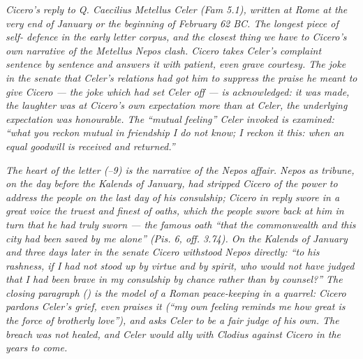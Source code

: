 
\textit{Cicero's reply to Q. Caecilius Metellus Celer (Fam
5.1), written at Rome at the very end of January or the
beginning of February 62 BC. The longest piece of self-
defence in the early letter corpus, and the closest thing
we have to Cicero's own narrative of the Metellus Nepos
clash. Cicero takes Celer's complaint sentence by sentence
and answers it with patient, even grave courtesy. The
joke in the senate that Celer's relations had got him to
suppress the praise he meant to give Cicero --- the joke
which had set Celer off --- is acknowledged: it was made,
the laughter was at Cicero's own expectation more than at
Celer, the underlying expectation was honourable. The
``mutual feeling'' Celer invoked is examined: ``what you
reckon mutual in friendship I do not know; I reckon it
this: when an equal goodwill is received and returned.''}

\textit{The heart of the letter (--9) is
the narrative of the Nepos affair. Nepos as tribune, on
the day before the Kalends of January, had stripped
Cicero of the power to address the people on the last
day of his consulship; Cicero in reply swore in a great
voice the truest and finest of oaths, which the people
swore back at him in turn that he had truly sworn ---
the famous oath ``that the commonwealth and this city
had been saved by me alone'' (Pis. 6, off. 3.74). On the
Kalends of January and three days later in the senate
Cicero withstood Nepos directly: ``to his rashness, if I
had not stood up by virtue and by spirit, who would not
have judged that I had been brave in my consulship by
chance rather than by counsel?'' The closing paragraph
() is the model of a Roman peace-keeping
in a quarrel: Cicero pardons Celer's grief, even praises
it (``my own feeling reminds me how great is the force
of brotherly love''), and asks Celer to be a fair judge
of his own. The breach was not healed, and Celer would
ally with Clodius against Cicero in the years to come.}
